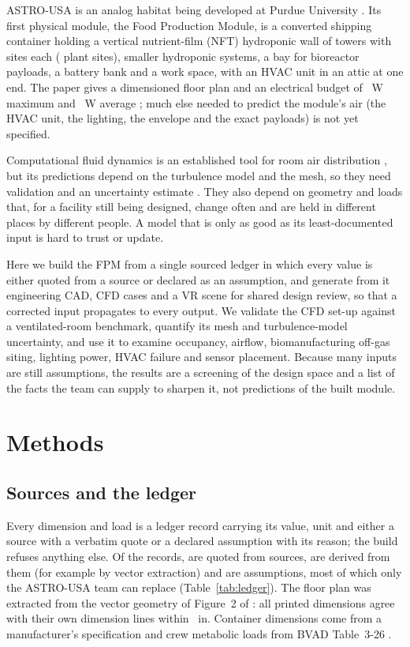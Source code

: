 \documentclass[11pt]{article}
\begin{document}
ASTRO-USA is an analog habitat being developed at Purdue University \citep{peters2026astro}. Its first physical module, the
Food Production Module, is a converted shipping container holding a vertical nutrient-film (NFT) hydroponic wall of
\NTowers{} towers with \NSitesPerTower{} sites each (\NSites{} plant sites), smaller hydroponic systems, a
bay for bioreactor payloads, a battery bank and a work space, with an HVAC unit in
an attic at one end. The paper gives a dimensioned floor plan and an electrical budget of \LoadMax~W maximum and
\LoadAvg~W average \citep{peters2026astro}; much else needed to predict the module's air (the HVAC unit, the
lighting, the envelope and the exact payloads) is not yet specified.

Computational fluid dynamics is an established tool for room air distribution \citep{nielsen2015fifty}, but its
predictions depend on the turbulence model \citep{chen1995kepsilon} and the mesh, so they need validation and an
uncertainty estimate \citep{celik2008gci}. They also depend on geometry and loads that, for a facility still being
designed, change often and are held in different places by different people. A model that is only as good as its
least-documented input is hard to trust or update.

Here we build the FPM from a single sourced ledger in which every value is either quoted from a source or declared as
an assumption, and generate from it engineering CAD, CFD cases and a VR scene for shared design review, so that a
corrected input propagates to every output. We validate the CFD set-up against a ventilated-room benchmark, quantify
its mesh and turbulence-model uncertainty, and use it to examine occupancy, airflow, biomanufacturing off-gas siting,
lighting power, HVAC failure and sensor placement. Because many inputs are still assumptions, the results are a
screening of the design space and a list of the facts the team can supply to sharpen it, not predictions of the
built module.

\section{Methods}
\subsection{Sources and the ledger}
Every dimension and load is a ledger record carrying its value, unit and either a source with a verbatim quote or a
declared assumption with its reason; the build refuses anything else. Of the \NRecords{} records, \NSpecified{} are
quoted from sources, \NDerived{} are derived from them (for example by vector extraction) and \NAssumed{} are
assumptions, most of which only the ASTRO-USA team can replace (Table~\ref{tab:ledger}). The floor plan was extracted from the vector
geometry of Figure~2 of \citet{peters2026astro}: all \FigTwoDims{} printed dimensions agree with their own dimension
lines within \FigTwoMaxErrIn{}~in. Container dimensions come from a manufacturer's specification \citep{seacube40hc}
and crew metabolic loads from BVAD Table~3-26 \citep{bvad2022}.
\end{document}
